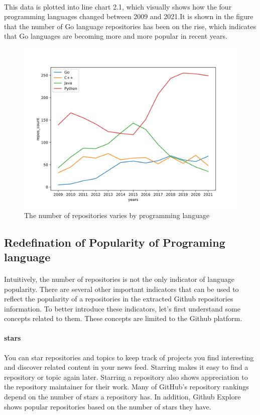 \documentclass[11pt,onside,a4paper,fleqn]{report}
\begin{document}
\paragraph{} This data is plotted into line chart 2.1, which visually shows how the four programming languages changed between 2009 and 2021.It is shown in the figure that the number of Go language repositories has been on the rise, which indicates that Go
languages are becoming more and more popular in recent years.

\begin{figure}[ht]
\centering
\includegraphics[scale=0.6]{result/yearsChange.png}
\caption{The number of repositories varies by programming language}
\label{fig:pathdemo4}
\end{figure}

\subsection{Redefination of Popularity of Programing language}
\paragraph{} Intuitively, the number of repositories is not the only indicator of language popularity. There are several
other important indicators that can be used to reflect the popularity of a repositories in the extracted
Github repositories information. To better introduce these indicators, let's first understand some concepts
related to them. These concepts are limited to the Github platform.

\paragraph{stars} You can star repositories and topics to keep track of projects you find interesting and discover related 
content in your news feed. Starring makes it easy to find a repository or topic again later. Starring a repository 
also shows appreciation to the repository maintainer for their work. Many of GitHub's repository rankings 
depend on the number of stars a repository has. In addition, Github Explore shows popular repositories based 
on the number of stars they have.
\end{document}
